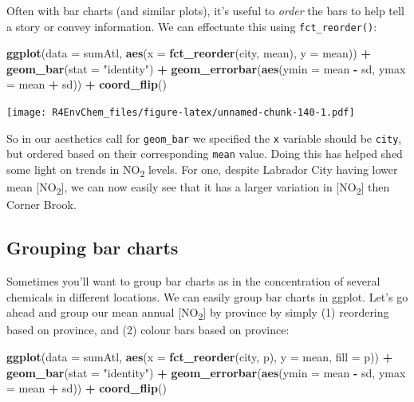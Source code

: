 \documentclass[
]{book}
\newenvironment{Shaded}{\begin{snugshade}}{\end{snugshade}}
\newcommand{\AttributeTok}[1]{\textcolor[rgb]{0.13,0.29,0.53}{#1}}
\newcommand{\FunctionTok}[1]{\textcolor[rgb]{0.13,0.29,0.53}{\textbf{#1}}}
\newcommand{\NormalTok}[1]{#1}
\newcommand{\SpecialCharTok}[1]{\textcolor[rgb]{0.81,0.36,0.00}{\textbf{#1}}}
\newcommand{\StringTok}[1]{\textcolor[rgb]{0.31,0.60,0.02}{#1}}
\begin{document}
Often with bar charts (and similar plots), it's useful to \emph{order} the bars to help tell a story or convey information. We can effectuate this using \texttt{fct\_reorder()}:

\begin{Shaded}
\begin{Highlighting}[]
\FunctionTok{ggplot}\NormalTok{(}\AttributeTok{data =}\NormalTok{ sumAtl, }
       \FunctionTok{aes}\NormalTok{(}\AttributeTok{x =} \FunctionTok{fct\_reorder}\NormalTok{(city, mean),}
           \AttributeTok{y =}\NormalTok{ mean)) }\SpecialCharTok{+}
  \FunctionTok{geom\_bar}\NormalTok{(}\AttributeTok{stat =} \StringTok{"identity"}\NormalTok{) }\SpecialCharTok{+}
  \FunctionTok{geom\_errorbar}\NormalTok{(}\FunctionTok{aes}\NormalTok{(}\AttributeTok{ymin =}\NormalTok{ mean }\SpecialCharTok{{-}}\NormalTok{ sd, }
                    \AttributeTok{ymax =}\NormalTok{ mean }\SpecialCharTok{+}\NormalTok{ sd)) }\SpecialCharTok{+}
  \FunctionTok{coord\_flip}\NormalTok{()}
\end{Highlighting}
\end{Shaded}

\texttt{[image: R4EnvChem\_files/figure-latex/unnamed-chunk-140-1.pdf]}

So in our aesthetics call for \texttt{geom\_bar} we specified the \texttt{x} variable should be \texttt{city}, but ordered based on their corresponding \texttt{mean} value. Doing this has helped shed some light on trends in NO\textsubscript{2} levels. For one, despite Labrador City having lower mean {[}NO\textsubscript{2}{]}, we can now easily see that it has a larger variation in {[}NO\textsubscript{2}{]} then Corner Brook.

\hypertarget{grouping-bar-charts}{%
\subsection{Grouping bar charts}\label{grouping-bar-charts}}

Sometimes you'll want to group bar charts as in the concentration of several chemicals in different locations. We can easily group bar charts in ggplot. Let's go ahead and group our mean annual {[}NO\textsubscript{2}{]} by province by simply (1) reordering based on province, and (2) colour bars based on province:

\begin{Shaded}
\begin{Highlighting}[]
\FunctionTok{ggplot}\NormalTok{(}\AttributeTok{data =}\NormalTok{ sumAtl, }
       \FunctionTok{aes}\NormalTok{(}\AttributeTok{x =} \FunctionTok{fct\_reorder}\NormalTok{(city, p),}
           \AttributeTok{y =}\NormalTok{ mean, }
           \AttributeTok{fill =}\NormalTok{ p)) }\SpecialCharTok{+}
  \FunctionTok{geom\_bar}\NormalTok{(}\AttributeTok{stat =} \StringTok{"identity"}\NormalTok{) }\SpecialCharTok{+}
  \FunctionTok{geom\_errorbar}\NormalTok{(}\FunctionTok{aes}\NormalTok{(}\AttributeTok{ymin =}\NormalTok{ mean }\SpecialCharTok{{-}}\NormalTok{ sd, }
                    \AttributeTok{ymax =}\NormalTok{ mean }\SpecialCharTok{+}\NormalTok{ sd)) }\SpecialCharTok{+}
  \FunctionTok{coord\_flip}\NormalTok{()}
\end{Highlighting}
\end{Shaded}
\end{document}
